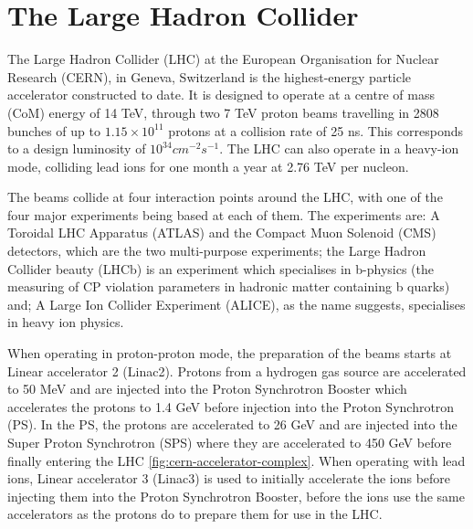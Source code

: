 \section{The Large Hadron Collider}\label{sec:lhc}

The Large Hadron Collider (LHC) at the European Organisation for Nuclear Research (CERN), in Geneva, Switzerland is the highest-energy particle accelerator constructed to date. 
It is designed to operate at a centre of mass (CoM) energy of 14 TeV, through two 7 TeV proton beams travelling in 2808 bunches of up to $1.15 \times 10^{11}$ protons at a collision rate of 25 ns. 
This corresponds to a design luminosity of $10^{34}cm^{-2}s^{-1}$. 
The LHC can also operate in a heavy-ion mode, colliding lead ions for one month a year at 2.76 TeV per nucleon\cite{Bayatian:2006zz}. 

The beams collide at four interaction points around the LHC, with one of the four major experiments being based at each of them. 
The experiments are: A Toroidal LHC Apparatus (ATLAS) and the Compact Muon Solenoid (CMS) detectors, which are the two multi-purpose experiments; the Large Hadron Collider beauty (LHCb) is an experiment which specialises in b-physics (the measuring of CP violation parameters in hadronic matter containing b quarks) and; A Large Ion Collider Experiment (ALICE), as the name suggests, specialises in heavy ion physics\cite{Brüning:782076}. 

When operating in proton-proton mode, the preparation of the beams starts at Linear accelerator 2 (Linac2). 
Protons from a hydrogen gas source are accelerated to 50 MeV and are injected into the Proton Synchrotron Booster which accelerates the protons to 1.4 GeV before injection into the Proton Synchrotron (PS). 
In the PS, the protons are accelerated to 26 GeV and are injected into the Super Proton Synchrotron (SPS) where they are accelerated to 450 GeV before finally entering the LHC \ref{fig:cern-accelerator-complex}. 
When operating with lead ions, Linear accelerator 3 (Linac3) is used to initially accelerate the ions before injecting them into the Proton Synchrotron Booster, before the ions use the same accelerators as the protons do to prepare them for use in the LHC\cite{Brüning:782076}. 

